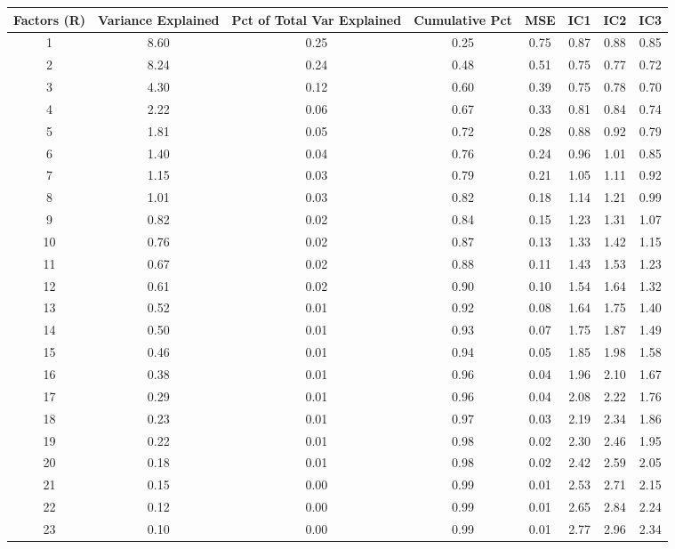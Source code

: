 \documentclass[11pt, letterpaper]{article}\usepackage[]{graphicx}\usepackage[]{color}
\begin{document}
\begin{table}[H]
\centering
\begingroup\scriptsize
\begin{tabular}{cccccccc}
  \hline
Factors (R) & Variance Explained & Pct of Total Var Explained & Cumulative Pct & MSE & IC1 & IC2 & IC3 \\ 
  \hline
  1 & 8.60 & 0.25 & 0.25 & 0.75 & 0.87 & 0.88 & 0.85 \\ 
    2 & 8.24 & 0.24 & 0.48 & 0.51 & 0.75 & 0.77 & 0.72 \\ 
    3 & 4.30 & 0.12 & 0.60 & 0.39 & 0.75 & 0.78 & 0.70 \\ 
    4 & 2.22 & 0.06 & 0.67 & 0.33 & 0.81 & 0.84 & 0.74 \\ 
    5 & 1.81 & 0.05 & 0.72 & 0.28 & 0.88 & 0.92 & 0.79 \\ 
    6 & 1.40 & 0.04 & 0.76 & 0.24 & 0.96 & 1.01 & 0.85 \\ 
    7 & 1.15 & 0.03 & 0.79 & 0.21 & 1.05 & 1.11 & 0.92 \\ 
    8 & 1.01 & 0.03 & 0.82 & 0.18 & 1.14 & 1.21 & 0.99 \\ 
    9 & 0.82 & 0.02 & 0.84 & 0.15 & 1.23 & 1.31 & 1.07 \\ 
   10 & 0.76 & 0.02 & 0.87 & 0.13 & 1.33 & 1.42 & 1.15 \\ 
   11 & 0.67 & 0.02 & 0.88 & 0.11 & 1.43 & 1.53 & 1.23 \\ 
   12 & 0.61 & 0.02 & 0.90 & 0.10 & 1.54 & 1.64 & 1.32 \\ 
   13 & 0.52 & 0.01 & 0.92 & 0.08 & 1.64 & 1.75 & 1.40 \\ 
   14 & 0.50 & 0.01 & 0.93 & 0.07 & 1.75 & 1.87 & 1.49 \\ 
   15 & 0.46 & 0.01 & 0.94 & 0.05 & 1.85 & 1.98 & 1.58 \\ 
   16 & 0.38 & 0.01 & 0.96 & 0.04 & 1.96 & 2.10 & 1.67 \\ 
   17 & 0.29 & 0.01 & 0.96 & 0.04 & 2.08 & 2.22 & 1.76 \\ 
   18 & 0.23 & 0.01 & 0.97 & 0.03 & 2.19 & 2.34 & 1.86 \\ 
   19 & 0.22 & 0.01 & 0.98 & 0.02 & 2.30 & 2.46 & 1.95 \\ 
   20 & 0.18 & 0.01 & 0.98 & 0.02 & 2.42 & 2.59 & 2.05 \\ 
   21 & 0.15 & 0.00 & 0.99 & 0.01 & 2.53 & 2.71 & 2.15 \\ 
   22 & 0.12 & 0.00 & 0.99 & 0.01 & 2.65 & 2.84 & 2.24 \\ 
   23 & 0.10 & 0.00 & 0.99 & 0.01 & 2.77 & 2.96 & 2.34 \\ 

\end{tabular}
\end{table}
\end{document}
